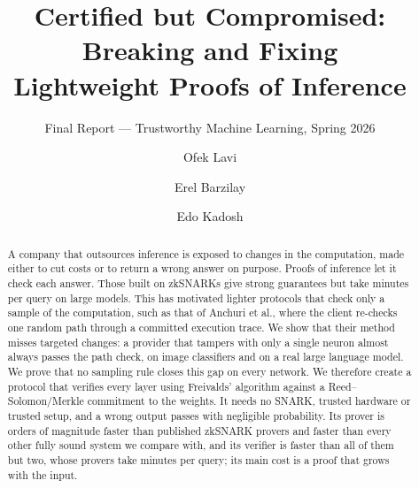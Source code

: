 \documentclass[sigconf,nonacm]{acmart}
\begin{document}
\title[Certified but Compromised: Breaking and Fixing Lightweight Proofs of Inference]{Certified but Compromised: Breaking and Fixing\\ Lightweight Proofs of Inference}
\subtitle{Final Report --- Trustworthy Machine Learning, Spring 2026}

\author{Ofek Lavi}

\author{Erel Barzilay}

\author{Edo Kadosh}

\begin{abstract}
A company that outsources inference is exposed to changes in the computation, made either to cut
costs or to return a wrong answer on purpose. Proofs of inference let it check each answer. Those
built on zkSNARKs give strong guarantees but take minutes per query on large models. This has
motivated lighter protocols that check only a sample of the computation, such as that of Anchuri
et al., where the client re-checks one random path through a committed execution trace. We show
that their method misses targeted changes: a provider that tampers with only a single neuron almost
always passes the path check, on image classifiers and on a real large language model. We prove
that no sampling rule closes this gap on every network. We therefore create a protocol that
verifies every layer using Freivalds' algorithm against a Reed--Solomon/Merkle commitment to the
weights. It needs no SNARK, trusted hardware or trusted setup, and a wrong output passes with
negligible probability. Its
prover is orders of magnitude faster than published zkSNARK provers and faster than every other fully sound system we compare with, and its verifier is faster than all of them but two, whose provers take minutes per query; its main cost is a proof that grows with the input.
\end{abstract}


\maketitle
\end{document}

